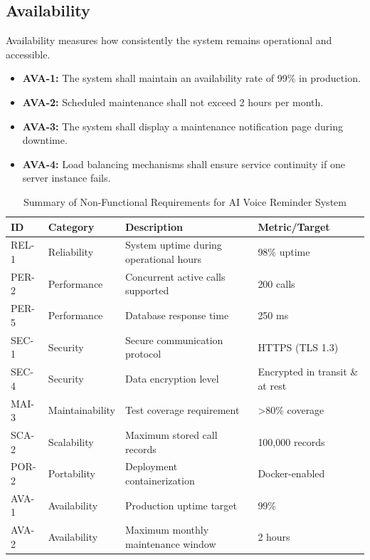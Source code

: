\documentclass[12pt,a4paper]{report}
\begin{document}
\subsection{Availability}

Availability measures how consistently the system remains operational and accessible.

\begin{itemize}
\item \textbf{AVA-1:} The system shall maintain an availability rate of 99\% in production.
\item \textbf{AVA-2:} Scheduled maintenance shall not exceed 2 hours per month.
\item \textbf{AVA-3:} The system shall display a maintenance notification page during downtime.
\item \textbf{AVA-4:} Load balancing mechanisms shall ensure service continuity if one server instance fails.
\end{itemize}
\begin{table}[H]
\centering
\caption{Summary of Non-Functional Requirements for AI Voice Reminder System}
\begin{tabularx}{\textwidth}{|l|l|X|l|}
\hline
\textbf{ID} & \textbf{Category} & \textbf{Description} & \textbf{Metric/Target} \\ \hline
REL-1 & Reliability & System uptime during operational hours & 98\% uptime \\ \hline
PER-2 & Performance & Concurrent active calls supported & 200 calls \\ \hline
PER-5 & Performance & Database response time & 250 ms \\ \hline
SEC-1 & Security & Secure communication protocol & HTTPS (TLS 1.3) \\ \hline
SEC-4 & Security & Data encryption level & Encrypted in transit \& at rest \\ \hline
MAI-3 & Maintainability & Test coverage requirement & >80\% coverage \\ \hline
SCA-2 & Scalability & Maximum stored call records & 100,000 records \\ \hline
POR-2 & Portability & Deployment containerization & Docker-enabled \\ \hline
AVA-1 & Availability & Production uptime target & 99\% \\ \hline
AVA-2 & Availability & Maximum monthly maintenance window & 2 hours \\ \hline
\end{tabularx}
\end{table}

\end{document}

